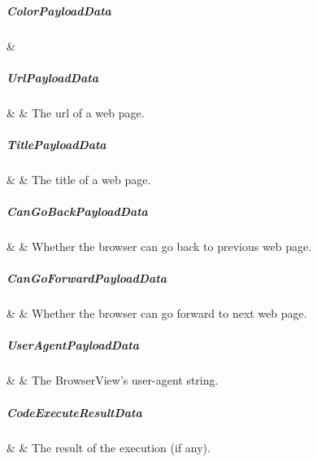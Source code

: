 \subparagraph{ColorPayloadData}

\begin{interface}
   &  \\ \hline
\end{interface}

\subparagraph{UrlPayloadData}

\begin{interfacedesc}
   &  & The \ac{url} of a web page. \\ \hline
\end{interfacedesc}

\subparagraph{TitlePayloadData}

\begin{interfacedesc}
   &  & The title of a web page. \\ \hline
\end{interfacedesc}

\subparagraph{CanGoBackPayloadData}

\begin{interfacedesc}
   &  & Whether the browser can go back to previous web page. \\ \hline
\end{interfacedesc}

\subparagraph{CanGoForwardPayloadData}

\begin{interfacedesc}
   &  & Whether the browser can go forward to next web page. \\ \hline
\end{interfacedesc}

\subparagraph{UserAgentPayloadData}

\begin{interfacedesc}
   &  & The BrowserView's user-agent string. \\ \hline
\end{interfacedesc}

\subparagraph{CodeExecuteResultData}

\begin{interfacedesc}
   &  & The result of the execution (if any). \\ \hline
\end{interfacedesc}

